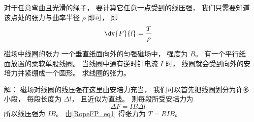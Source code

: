 对于任意弯曲且光滑的绳子， 要计算它任意一点受到的线压强， 我们只需要知道该点处的张力与曲率半径 $\rho$ 即可， 即
\begin{equation}
\dv{F}{l} = \frac{T}{\rho}
\end{equation}

\begin{example}{磁场中线圈的张力}
一个垂直纸面向外的匀强磁场中， 强度为 $B$。 有一个平行纸面放置的柔软单股线圈。 当线圈中通有逆时针电流 $I$ 时， 线圈就会受到向外的安培力并紧绷成一个圆形。 求线圈的张力。

解： 磁场对线圈的线压强在这里由安培力充当， 我们可以首先把线圈划分为许多小段， 每段长度为 $\Delta l$， 且近似为直线。 则每段所受安培力为
\begin{equation}
\Delta F = IB\Delta l
\end{equation}
所以线压强为 $IB$。 由\autoref{RopeFP_eq1} 得张力为 $T = RIB$。
\end{example}
